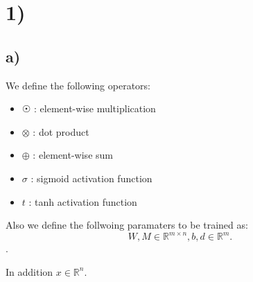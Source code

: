 \section*{1)} %

\subsection*{a)} %
\label{sub:a_}

We define the following operators: 

\begin{itemize}
	\item $\astrosun$ : element-wise multiplication
	\item $\otimes$ : dot product 
	\item $\oplus$ : element-wise sum
	\item $\sigma$ : sigmoid activation function
	\item $t$ : tanh activation function
\end{itemize}

Also we define the follwoing paramaters to be trained as:
\[
W, M \in \mathbb{R}^{m \times n}, b,d \in \mathbb{R}^{m}. 
\].

In addition $x \in \mathbb{R}^{n}$.

